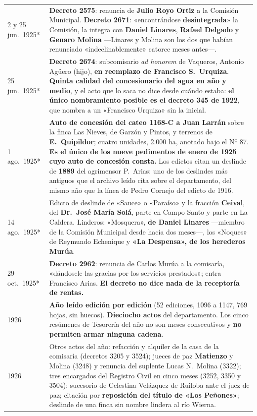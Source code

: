\begin{longtable}{@{}p{2.7cm}p{10.3cm}@{}}
2 y 25 jun.\ 1925* & \textbf{Decreto 2575}: renuncia de \textbf{Julio Royo Ortiz} a la Comisión Municipal. \textbf{Decreto 2671}: «encontrándose \textbf{desintegrada}» la Comisión, la integra con \textbf{Daniel Linares}\index{Linares, Daniel}, \textbf{Rafael Delgado} y \textbf{Genaro Molina} ---Linares y Molina son los dos que habían renunciado «indeclinablemente» catorce meses antes---. \\
25 jun.\ 1925* & \textbf{Decreto 2674}: subcomisario \textit{ad honorem} de Vaqueros, Antonio Agüero (hijo), \textbf{en reemplazo de Francisco S.\ Urquiza}\index{Urquiza, Francisco S.}. \textbf{Quinta calidad del concesionario del agua en año y medio}, y el acto que lo saca no dice desde cuándo estaba: \textbf{el único nombramiento posible es el decreto 345 de 1922}, que nombra a un «Francisco Urquiza» sin la inicial. \\
1 ago.\ 1925* & \textbf{Auto de concesión del cateo 1168-C a Juan Larrán} sobre la finca Las Nieves, de Garzón y Pintos, y terrenos de \textbf{E.\ Quipildor}; cuatro unidades, 2.000 ha, anotado bajo el Nº 87. \textbf{Es el único de los nueve pedimentos de enero de 1925 cuyo auto de concesión consta.} Los edictos citan un deslinde de \textbf{1889} del agrimensor P.\ Arias: uno de los deslindes más antiguos que el archivo leído cita sobre el departamento, del mismo año que la línea de Pedro Cornejo del edicto de 1916. \\
14 ago.\ 1925* & Edicto de deslinde de «Sauce» o «Paraíso» y la fracción \textbf{Ceival}, del \textbf{Dr.\ José María Solá}, parte en Campo Santo y parte en La Caldera. Linderos: «Mosquera», \textbf{de Daniel Linares}\index{Linares, Daniel} ---miembro de la Comisión Municipal desde hacía dos meses---, los «Noques» de Reymundo Echenique y \textbf{«La Despensa», de los herederos Murúa}. \\
29 oct.\ 1925* & \textbf{Decreto 2962}: renuncia de Carlos Murúa\index{Murúa, Carlos} a la comisaría, «dándosele las gracias por los servicios prestados»; entra Francisco Arias. \textbf{El decreto no dice nada de la receptoría de rentas.} \\
1926 & \textbf{Año leído edición por edición} (52 ediciones, 1096 a 1147, 769 hojas, sin huecos). \textbf{Dieciocho actos} del departamento. Los cinco resúmenes de Tesorería del año no son meses consecutivos y \textbf{no permiten armar ninguna cadena}. \\
1926 & Otros actos del año: refacción y alquiler de la casa de la comisaría (decretos 3205 y 3524); jueces de paz \textbf{Matienzo} y Molina (3248) y renuncia del suplente Lucas N.\ Molina (3322); tres encargados del Registro Civil en cinco meses (3252, 3350 y 3504); sucesorio de Celestina Velázquez de Ruiloba ante el juez de paz; citación por \textbf{reposición del título de «Los Peñones»}; deslinde de una finca sin nombre lindera al río Wierna. \\

\end{longtable}
